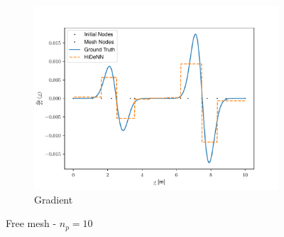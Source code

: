 \begin{figure}
\begin{subfigure}{0.3\linewidth}
        \includegraphics[width=\linewidth]{Figures/Solution_gradients_10_Regul.pdf}
        \caption{Gradient}
    \end{subfigure}
    \caption{Free mesh - $n_p=10$}
    \label{fig:Free_Mesh10Float64}
\end{figure}